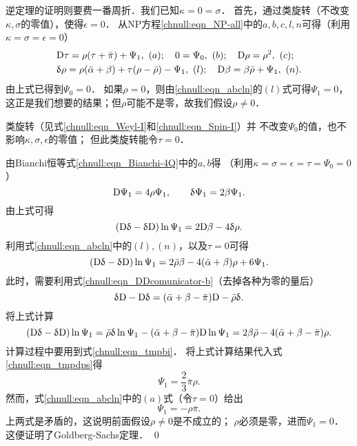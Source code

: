 逆定理的证明则要费一番周折．我们已知$\kappa=0=\sigma$．
首先，通过类旋转（不改变$\kappa,\sigma$的零值），使得$\epsilon=0$．
从NP方程\eqref{chnull:eqn_NP-all}中的$a,b,c,l,n$可得（利用$\kappa=\sigma=\epsilon=0$）
\begin{equation}\label{chnull:eqn_abcln}
    \begin{aligned}
        &{\rm D}\tau  =  \rho(\tau +\bar{\pi }) + \Psi _{1} ,   \ (a); \quad
        0 = \Psi_{0},        \ (b); \quad
        {\rm D}\rho  =  \rho ^{2},  \ (c);        \\
        &\updelta \rho  =\rho (\bar{\alpha }+\beta)
        +\tau(\rho -\bar{\rho })       -\Psi _{1} , \ (l); \quad
        {\rm D}\beta  =   \beta\bar{\rho } +\Psi _{1} , \ (n) .
    \end{aligned}
\end{equation}
由上式已得到$\Psi_{0}=0$．
如果$\rho=0$，则由\eqref{chnull:eqn_abcln}的$(l)$式可得$\Psi_1=0$，
这正是我们想要的结果；但$\rho$可能不是零，故我们假设$\rho\neq 0$．

类旋转（见式\eqref{chnull:eqn_Weyl-I}和\eqref{chnull:eqn_Spin-I}）并
不改变$\Psi_0$的值，也不影响$\kappa,\sigma,\epsilon$的零值；
但此类旋转能令$\tau=0$．

由Bianchi恒等式\eqref{chnull:eqn_Bianchi-4Q}中的$a,b$得
（利用$\kappa=\sigma=\epsilon=\tau=\Psi_0=0$）
\begin{equation}\label{chnull:eqn_tmpbi}
    {\rm D}\Psi _{1}  =4\rho \Psi _{1} ,\qquad
    \updelta \Psi_{1} =2\beta\Psi _{1} .
\end{equation}
由上式可得
\begin{equation}
    ({\rm D}\updelta - \updelta{\rm D}) \ln \Psi _{1}
    =2{\rm D}\beta -4 \updelta \rho .
\end{equation}
利用式\eqref{chnull:eqn_abcln}中的$(l),(n)$，以及$\tau=0$可得
\begin{equation}\label{chnull:eqn_tmpdps}
    ({\rm D}\updelta - \updelta{\rm D}) \ln \Psi _{1}
    =2 \bar{\rho} \beta -4 (\bar{\alpha}+\beta)\rho + 6\Psi_1 .
\end{equation}
此时，需要利用式\eqref{chnull:eqn_DDcomunicator-b}（去掉各种为零的量后）
\begin{equation}
    \updelta {\rm D}-{\rm D}\updelta =(\bar{\alpha}+\beta -\bar{\pi}){\rm D}
    -\bar{\rho}\updelta .
\end{equation}
将上式计算
\begin{equation}
    ({\rm D}\updelta-\updelta {\rm D}) \ln\Psi_1 =
    \bar{\rho}\updelta \ln\Psi_1 -
    (\bar{\alpha}+\beta -\bar{\pi}){\rm D}\ln\Psi_1
    =2\beta\bar{\rho} - 4 (\bar{\alpha}+\beta -\bar{\pi})\rho.
\end{equation}
计算过程中要用到式\eqref{chnull:eqn_tmpbi}．
将上式计算结果代入式\eqref{chnull:eqn_tmpdps}得
\begin{equation}\label{chnull:eqn_tmpallldps}
    \Psi_1=  \frac{2}{3} \bar{\pi} \rho .
\end{equation}
然而，式\eqref{chnull:eqn_abcln}中的$(a)$式（令$\tau=0$）给出
\begin{equation}
    \Psi _{1}  = - \rho \bar{\pi } .
\end{equation}
上两式是矛盾的，这说明前面假设$\rho\neq 0$是不成立的；
$\rho$必须是零，进而$\Psi_1=0$．
这便证明了Goldberg-Sachs定理．
\qed

